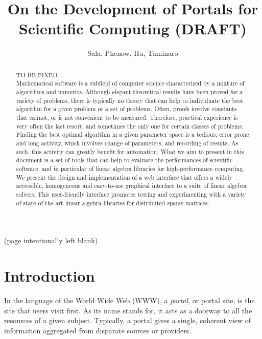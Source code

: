 \documentclass[11pt,relax]{SANDreport}
\author{Sala, Phenow, Hu, Tuminaro}
\title{On the Development of Portals for Scientific Computing (DRAFT)}
\begin{document}
\maketitle

\begin{abstract}
TO BE FIXED.... \\

Mathematical software is a subfield of computer science
characterized by a mixture of algorithms and numerics. Although elegant
theoretical results have been proved for a variety of problems, there is
typically no theory that can help to individuate the best algorithm for a
given problem or a set of problems. Often, proofs involve constants that
cannot, or is not convenient to be measured. Therefore, practical experience
is very often the last resort, and sometimes the only one for certain classes
of problems. Finding the best optimal algorithm in a given parameter space is
a tedious, error prone and long activity, which involves change of parameters,
and recording of results. As such, this activity can greatly benefit for
automation.  What we aim to present in this document is a set of tools that
can help to  evaluate the performances of scientific software, and in
particular of linear algebra libraries for high-performance computing. We
present the design and implementation of a  web interface that offers
a widely accessible, homogeneous
and easy-to-use graphical interface to a suite of linear algebra solvers.
This user-friendly interface promotes testing and
experimenting with a variety of state-of-the-art linear algebra libraries for
distributed sparse matrices.
\end{abstract}

\clearpage
\begin{center}
(page intentionally left blank)
\end{center}

\SANDmain

\tableofcontents

\clearpage
\newpage


\section{Introduction}

In the language of the World Wide Web (WWW), a {\sl portal}, or portal site,
is the site that users visit first. As its name stands for, it acts as a
doorway to all the resources of a given subject. Typically, a portal gives a
single, coherent view of information aggregated from disparate sources or
providers. 
\end{document}
